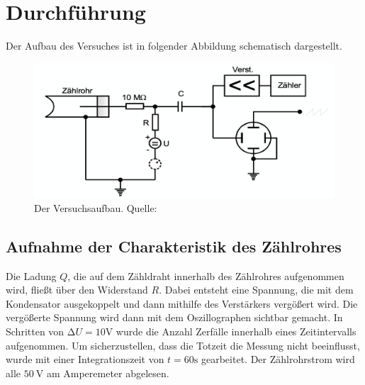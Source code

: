 \newpage
\section{Durchführung}
\label{sec:Durchführung}
Der Aufbau des Versuches ist in folgender Abbildung schematisch dargestellt.
  \begin{figure}[H]
    \centering
      \includegraphics[scale=0.6]{content/AufbauV703.png}
      \caption{Der Versuchsaufbau. Quelle:\cite{AP01}}
      \label{fig:aufbau3}
  \end{figure}
\noindent
\subsection{Aufnahme der Charakteristik des Zählrohres}
    Die Ladung $Q$, die auf dem Zähldraht innerhalb des Zählrohres aufgenommen wird, fließt über den
    Widerstand $R$. Dabei entsteht eine Spannung, die mit dem Kondensator ausgekoppelt und dann
    mithilfe des Verstärkers vergößert wird. Die vergößerte Spannung wird dann mit dem Oszillographen
    sichtbar gemacht. In Schritten von $\increment U = 10 \si{\volt}$ wurde die Anzahl Zerfälle
    innerhalb eines Zeitintervalls aufgenommen. Um sicherzustellen, dass die Totzeit die Messung nicht
    beeinflusst, wurde mit einer Integrationszeit von $t = 60 \si{\second}$ gearbeitet. Der
    Zählrohrstrom wird alle $\SI{50}{\volt}$ am Amperemeter abgelesen.
